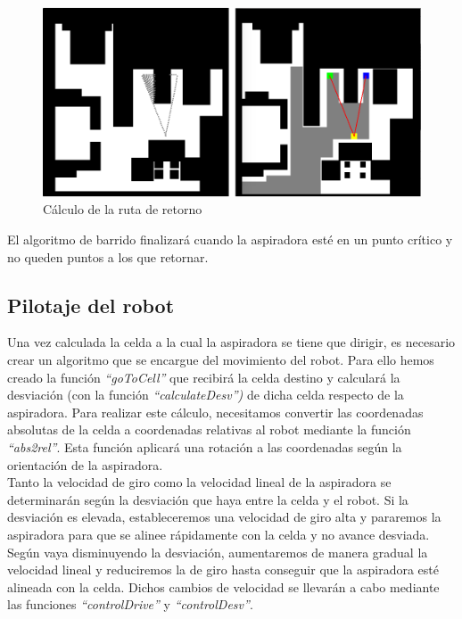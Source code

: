 \begin{figure}[H]
  \begin{center}
    \includegraphics[width=1.0\textwidth]{figures/Vacuum/visibilidadEntreDosPuntos.png}
		\caption{Cálculo de la ruta de retorno}
		\label{fig.rutaRet}
		\end{center}
\end{figure}

El algoritmo de barrido finalizará cuando la aspiradora esté en un punto crítico y no queden puntos a los que retornar.


\subsection{Pilotaje del robot}

Una vez calculada la celda a la cual la aspiradora se tiene que dirigir, es necesario crear un algoritmo que se encargue del movimiento del robot. Para ello hemos creado la función \textit{``goToCell''} que recibirá la celda destino y calculará la desviación (con la función \textit{``calculateDesv'')} de dicha celda respecto de la aspiradora. Para realizar este cálculo, necesitamos convertir las coordenadas absolutas de la celda a coordenadas relativas al robot mediante la función \textit{``abs2rel''}. Esta función aplicará una rotación a las coordenadas según la orientación de la aspiradora.\\

Tanto la velocidad de giro como la velocidad lineal de la aspiradora se determinarán según la desviación que haya entre la celda y el robot. Si la desviación es elevada, estableceremos una velocidad de giro alta y pararemos la aspiradora para que se alinee rápidamente con la celda y no avance desviada. Según vaya disminuyendo la desviación, aumentaremos de manera gradual la velocidad lineal y reduciremos la de giro hasta conseguir que la aspiradora esté alineada con la celda. Dichos cambios de velocidad se llevarán a cabo mediante las funciones \textit{``controlDrive''} y \textit{``controlDesv''}. \\


